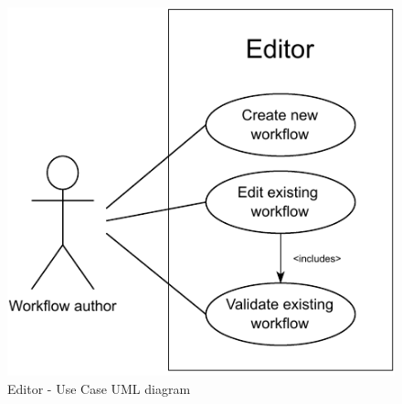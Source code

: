 \begin{figure}[h!]
    \includegraphics{./img/editorUC.pdf}
    \caption{Editor - Use Case UML diagram}
\end{figure}

